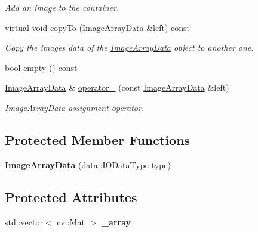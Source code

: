 \begin{DoxyCompactItemize}
\begin{DoxyCompactList}\small\item\em Add an image to the container. \end{DoxyCompactList}\item 
virtual void \hyperlink{classfilter_1_1data_1_1_image_array_data_abc051d3a4e57bdb5a3ee47e35df6ea9d}{copy\+To} (\hyperlink{classfilter_1_1data_1_1_image_array_data}{Image\+Array\+Data} \&left) const
\begin{DoxyCompactList}\small\item\em Copy the images\textquotesingle{} data of the \hyperlink{classfilter_1_1data_1_1_image_array_data}{Image\+Array\+Data} object to another one. \end{DoxyCompactList}\item 
bool \hyperlink{classfilter_1_1data_1_1_image_array_data_ac30c0a0384b1133a8c177e399ff9d140}{empty} () const
\item 
\hyperlink{classfilter_1_1data_1_1_image_array_data}{Image\+Array\+Data} \& \hyperlink{classfilter_1_1data_1_1_image_array_data_a6986bd7246e4468bf9afd2c2196608fc}{operator=} (const \hyperlink{classfilter_1_1data_1_1_image_array_data}{Image\+Array\+Data} \&left)
\begin{DoxyCompactList}\small\item\em \hyperlink{classfilter_1_1data_1_1_image_array_data}{Image\+Array\+Data} assignment operator. \end{DoxyCompactList}\end{DoxyCompactItemize}
\subsection*{Protected Member Functions}
\begin{DoxyCompactItemize}
\item 
\mbox{\label{classfilter_1_1data_1_1_image_array_data_ac5dce50dc7e25871855e6c86bce18925}} 
{\bfseries Image\+Array\+Data} (data\+::\+I\+O\+Data\+Type type)
\end{DoxyCompactItemize}
\subsection*{Protected Attributes}
\begin{DoxyCompactItemize}
\item 
\mbox{\label{classfilter_1_1data_1_1_image_array_data_ab46da947b17f81791d8b59038780b2cd}} 
std\+::vector$<$ cv\+::\+Mat $>$ {\bfseries \+\_\+array}
\end{DoxyCompactItemize}
